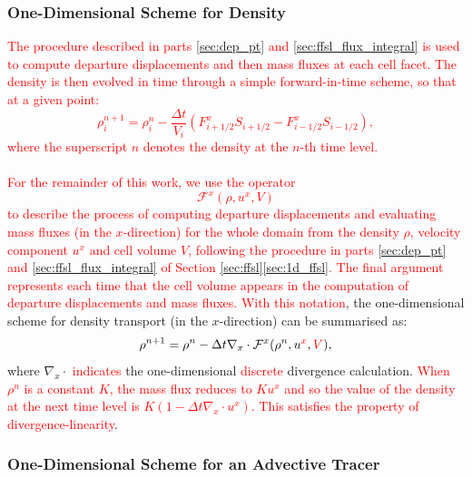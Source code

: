 \documentclass{ametsocV6.1}
\newcommand{\change}[1]{\textcolor{red}{#1}}
\begin{document}
\subsubsection{One-Dimensional Scheme for Density} 
\label{sec:1d_density}
\change{The procedure described in parts \ref{sec:dep_pt} and \ref{sec:ffsl_flux_integral} is used to compute departure displacements and then mass fluxes at each cell facet.
The density is then evolved in time through a simple forward-in-time scheme, so that at a given point:
\begin{equation}
\rho_i^{n+1} = \rho^n_i - \frac{\Delta t}{V_i} \left(F^x_{i+1/2}S_{i+1/2} - F^x_{i-1/2}S_{i-1/2}\right),
\end{equation}
where the superscript $n$ denotes the density at the $n$-th time level.} \\
\\
\change{For the remainder of this work, we use the operator
\begin{equation}
\mathcal{F}^x(\rho,u^{x},V)
\end{equation}
to describe the process of computing departure displacements and evaluating mass fluxes (in the $x$-direction) for the whole domain from the density $\rho$, velocity component $u^x$ and cell volume $V$, following the procedure in parts \ref{sec:dep_pt} and \ref{sec:ffsl_flux_integral} of Section \ref{sec:ffsl}\ref{sec:1d_ffsl}.
The final argument represents each time that the cell volume appears in the computation of departure displacements and mass fluxes. 
With this notation}, the one-dimensional scheme for density transport (in the $x$-direction) can be summarised as:
\begin{equation}
\rho^{n+1} = \rho^n - \Delta t \nabla_x\cdot \mathcal{F}^x(\rho^n,u^{\change{x}},\change{V}),
\end{equation}
where $\nabla_x\cdot$ \change{indicates} the one-dimensional \change{discrete} divergence calculation.
\change{When $\rho^n$ is a constant $K$, the mass flux reduces to $Ku^x$ and so the value of the density at the next time level is $K(1-\Delta t\nabla_x\cdot u^x)$. This satisfies the property of divergence-linearity}.

\subsubsection{One-Dimensional Scheme for an Advective Tracer} \label{sec:1d_advect}
\end{document}
